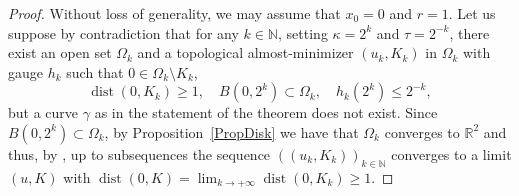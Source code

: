 \documentclass[12pt]{article}
\theoremstyle{definition}
\theoremstyle{remark}
\numberwithin{equation}{section}
\DeclareMathOperator{\dist}{dist}
\newcommand{\R}{\mathbb{R}}
\newcommand{\N}{\mathbb{N}}
\begin{document}
\begin{proof}
    Without loss of generality, we may assume that $x_0=0$ and $r=1$. Let us suppose by contradiction that for
    any $k\in\N$, setting $\kappa=2^k$ and $\tau=2^{-k}$, there exist an open set $\Omega_k$ and a topological
    almost-minimizer $(u_k,K_k)$ in $\Omega_k$ with gauge $h_k$ such that $0\in\Omega_k\setminus K_k$,
    \begin{equation}
        \label{eqeq23}
        \dist(0,K_k) \geq 1,\quad B(0,2^k)\subset\Omega_k, \quad h_k(2^k)\leq 2^{-k},
    \end{equation}
    but a curve $\gamma$ as in the statement of the theorem does not exist. Since $B(0,2^k)\subset\Omega_k$,
    by Proposition~\ref{PropDisk} we have that $\Omega_k$ converges to $\R^2$ and thus, by \cite[Lemma 3.2]{lablem},
    up to subsequences the sequence $((u_k,K_k))_{k\in\N}$ converges to a limit $(u,K)$ with
    $\dist(0,K) = \lim_{k\to+\infty}\dist(0,K_k) \geq 1$. 

\end{proof}
\end{document}

